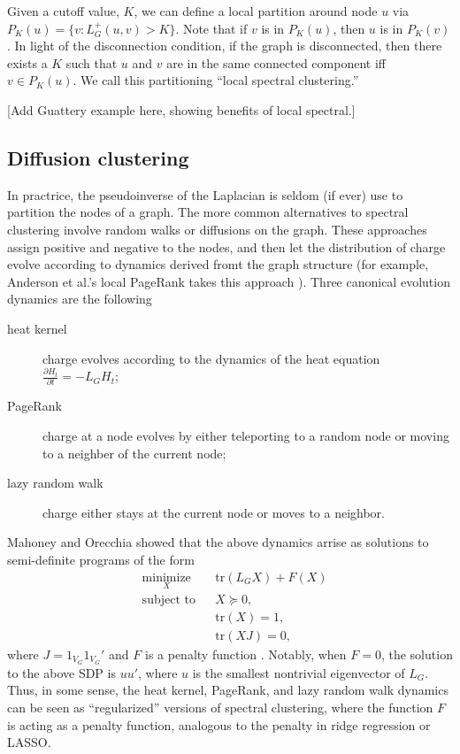 \documentclass[12pt]{article}
\theoremstyle{plain}
\begin{document}
Given a cutoff value, $K$, we can define a local partition around node
$u$ via $P_K(u) = \{ v : L_G^{+}(u,v) > K \}$.  Note that if $v$ is in
$P_K(u)$, then $u$ is in $P_K(v)$.  In light of the disconnection
condition, if the graph is disconnected, then there exists a $K$ such
that $u$ and $v$ are in the same connected component iff
$v \in P_K(u)$.  We call this partitioning ``local spectral
clustering.''

[Add Guattery example here, showing benefits of local spectral.]


\subsection{Diffusion clustering}

In practrice, the pseudoinverse of the Laplacian is seldom (if ever)
use to partition the nodes of a graph.  The more common alternatives
to spectral clustering involve random walks or diffusions on the
graph.  These approaches assign positive and negative to the nodes,
and then let the distribution of charge evolve according to dynamics
derived fromt the graph structure (for example, Anderson et al.'s local
PageRank takes this approach \cite{andersen2006local}).
Three canonical evolution dynamics are the following
\begin{description}
  \item[heat kernel]
    charge evolves according to the dynamics of the heat equation
    $\frac{\partial H_t}{\partial t} = - L_G H_t$;
  \item[PageRank]
    charge at a node evolves by either teleporting to a random node or moving
    to a neighber of the current node;
  \item[lazy random walk]
    charge either stays at the current node or moves to a neighbor.
\end{description}
Mahoney and Orecchia showed that the above dynamics arrise
as solutions to semi-definite programs of the form
\[
\begin{aligned}
  & \underset{X}{\text{minimize}}
  & & \mathrm{tr}(L_G X) + F(X) \\
  & \text{subject to}
  & & X \succeq 0, \\
  & & & \mathrm{tr}(X) = 1, \\
  & & & \mathrm{tr}(X J) = 0,
\end{aligned}
\]
where $J = 1_{V_G} 1_{V_G}'$ and $F$ is a penalty function
\cite{mahoney2010implementing}.  Notably, when $F = 0$, the solution
to the above SDP is $u u'$, where $u$ is the smallest nontrivial
eigenvector of $L_G$.  Thus, in some sense, the heat kernel, PageRank,
and lazy random walk dynamics can be seen as ``regularized'' versions
of spectral clustering, where the function $F$ is acting as a penalty
function, analogous to the penalty in ridge regression or LASSO.
\end{document}

